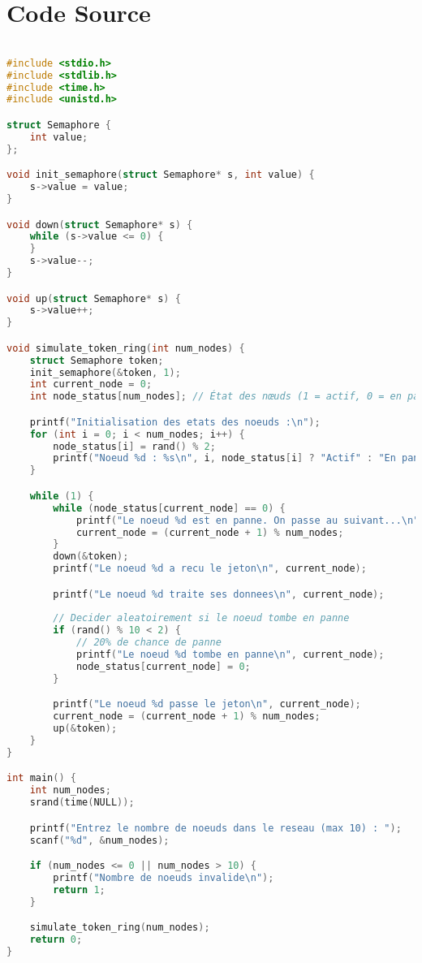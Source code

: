 \documentclass{rapportINPTCLOUD}
\begin{document}
\section{Code Source}
\begin{lstlisting}[language=C, caption={Implementation du Token Ring}, label={lst:tokenring}, breaklines=true]

#include <stdio.h>
#include <stdlib.h>
#include <time.h>
#include <unistd.h>

struct Semaphore {
    int value;
};

void init_semaphore(struct Semaphore* s, int value) {
    s->value = value;
}

void down(struct Semaphore* s) {
    while (s->value <= 0) {
    }
    s->value--;
}

void up(struct Semaphore* s) {
    s->value++;
}

void simulate_token_ring(int num_nodes) {
    struct Semaphore token;
    init_semaphore(&token, 1);
    int current_node = 0;
    int node_status[num_nodes]; // État des nœuds (1 = actif, 0 = en panne)

    printf("Initialisation des etats des noeuds :\n");
    for (int i = 0; i < num_nodes; i++) {
        node_status[i] = rand() % 2;
        printf("Noeud %d : %s\n", i, node_status[i] ? "Actif" : "En panne");
    }

    while (1) {
        while (node_status[current_node] == 0) {
            printf("Le noeud %d est en panne. On passe au suivant...\n", current_node);
            current_node = (current_node + 1) % num_nodes;
        }
        down(&token);
        printf("Le noeud %d a recu le jeton\n", current_node);

        printf("Le noeud %d traite ses donnees\n", current_node);
        
        // Decider aleatoirement si le noeud tombe en panne
        if (rand() % 10 < 2) {
            // 20% de chance de panne
            printf("Le noeud %d tombe en panne\n", current_node);
            node_status[current_node] = 0;
        }

        printf("Le noeud %d passe le jeton\n", current_node);
        current_node = (current_node + 1) % num_nodes;
        up(&token);
    }
}

int main() {
    int num_nodes;
    srand(time(NULL));

    printf("Entrez le nombre de noeuds dans le reseau (max 10) : ");
    scanf("%d", &num_nodes);

    if (num_nodes <= 0 || num_nodes > 10) {
        printf("Nombre de noeuds invalide\n");
        return 1;
    }

    simulate_token_ring(num_nodes);
    return 0;
}
\end{lstlisting}
\end{document}

